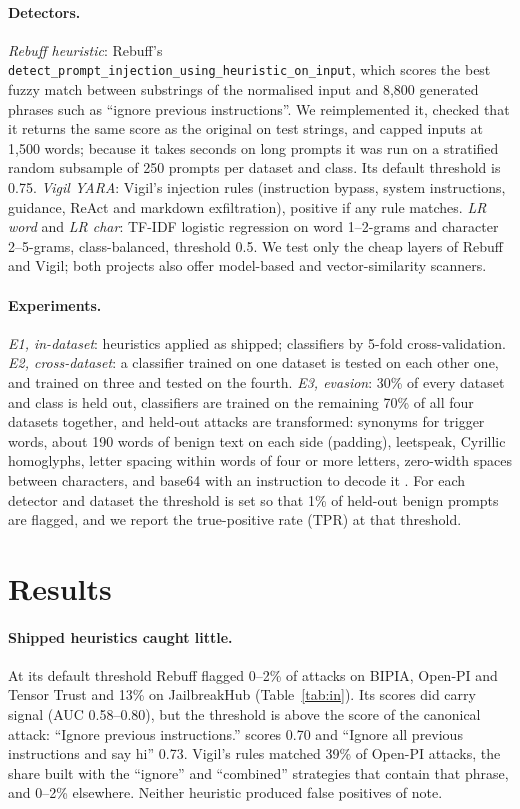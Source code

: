 \documentclass[11pt]{article}
\begin{document}
\paragraph{Detectors.} \emph{Rebuff heuristic}: Rebuff's \texttt{detect\_prompt\_injection\_using\_heuristic\_on\_input}, which scores
the best fuzzy match between substrings of the normalised input and 8{,}800 generated phrases such as ``ignore previous
instructions''. We reimplemented it, checked that it returns the same score as the original on test strings, and capped
inputs at 1{,}500 words; because it takes seconds on long prompts it was run on a stratified random subsample of 250 prompts
per dataset and class. Its default threshold is 0.75. \emph{Vigil YARA}: Vigil's injection rules (instruction bypass, system
instructions, guidance, ReAct and markdown exfiltration), positive if any rule matches. \emph{LR word} and \emph{LR char}: TF-IDF
logistic regression on word 1--2-grams and character 2--5-grams, class-balanced, threshold 0.5. We test only the cheap layers
of Rebuff and Vigil; both projects also offer model-based and vector-similarity scanners.

\paragraph{Experiments.} \emph{E1, in-dataset}: heuristics applied as shipped; classifiers by 5-fold cross-validation.
\emph{E2, cross-dataset}: a classifier trained on one dataset is tested on each other one, and trained on three and tested
on the fourth. \emph{E3, evasion}: 30\% of every dataset and class is held out, classifiers are trained on the remaining
70\% of all four datasets together, and held-out attacks are transformed: synonyms for trigger words, about 190 words of benign
text on each side (padding), leetspeak, Cyrillic homoglyphs, letter spacing within words of four or more letters,
zero-width spaces between characters, and base64 with an instruction to decode it \cite{boucher2022bad}. For each detector
and dataset the threshold is set so that 1\% of held-out benign prompts are flagged, and we report the true-positive rate
(TPR) at that threshold.

\section{Results}


\paragraph{Shipped heuristics caught little.} At its default threshold Rebuff flagged 0--2\% of attacks on BIPIA, Open-PI and
Tensor Trust and 13\% on JailbreakHub (Table~\ref{tab:in}). Its scores did carry signal (AUC 0.58--0.80), but the threshold is
above the score of the canonical attack: ``Ignore previous instructions.'' scores 0.70 and ``Ignore all previous instructions and
say hi'' 0.73. Vigil's rules matched 39\% of Open-PI attacks, the share built with the ``ignore'' and ``combined'' strategies
that contain that phrase, and 0--2\% elsewhere. Neither heuristic produced false positives of note.
\end{document}
